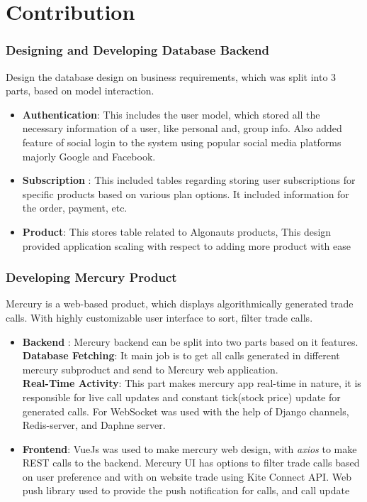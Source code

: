 \section{Contribution}
\subsubsection{Designing and Developing  Database Backend}
Design the database design on business requirements, which was split into 3 parts, based on model interaction. 
\begin{itemize}
\item \textbf{Authentication}: This includes the user model, which stored all the necessary information of a user, like personal and, group info. Also added feature of social login to the system using popular social media platforms majorly Google and Facebook.
\item \textbf{Subscription} : This included tables regarding storing user subscriptions for specific products based on various plan options. It included information for the order, payment, etc.
\item \textbf{Product}: This stores table related to Algonauts products, This design provided application scaling with respect to adding more product with ease
\end{itemize} 

\subsubsection{Developing Mercury Product}
Mercury is a web-based product, which displays algorithmically generated trade calls. With highly customizable user interface to sort, filter trade calls.
\begin{itemize}
\item \textbf{Backend} : Mercury backend can be split into two parts based on it features.\\
\tab  \textbf{Database Fetching}: It main job is to get all calls generated in different mercury subproduct and send to Mercury web application. \\
\tab \textbf{Real-Time Activity}: This part makes mercury app real-time in nature, it is responsible for live call updates and constant tick(stock price) update for generated calls. For WebSocket was used with the help of Django channels, Redis-server, and Daphne server.
\item \textbf{Frontend}: VueJs was used to make mercury web design, with \textit{axios} to make REST calls to the backend. Mercury UI has options to filter trade calls based on user preference and with on website trade using Kite Connect API. Web push library used to provide the push notification for calls, and call update
\end{itemize} 

